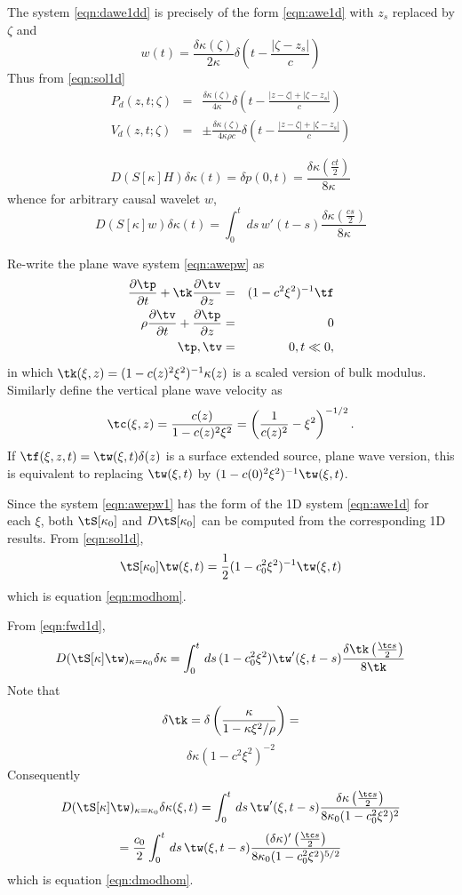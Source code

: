 The system \ref{eqn:dawe1dd} is precisely of the form
\ref{eqn:awe1d} with $z_s$ replaced by $\zeta$ and
\[
  w(t)= \frac{\delta\kappa(\zeta)}{2\kappa}\delta\left(t - \frac{|\zeta-z_s|}{c}\right)
\]
Thus from \ref{eqn:sol1d}
\begin{eqnarray*}
  P_d(z,t;\zeta) &=& \frac{\delta\kappa(\zeta)}{4\kappa} \delta\left(t - \frac{|z-\zeta|+|\zeta-z_s|}{c}\right) \nonumber \\
  V_d(z,t;\zeta) &=& \pm\frac{\delta\kappa(\zeta)}{4\kappa \rho c} \delta\left(t - \frac{|z-\zeta|+|\zeta-z_s|}{c}\right) 
\end{eqnarray*}

\begin{equation}
\label{eqn:imp1d}
D(S[\kappa]H)\delta \kappa (t) = \delta p(0,t)=  \frac{\delta 
  \kappa\left(\frac{ct}{2}\right)}{8\kappa} 
\end{equation}
whence for arbitrary causal wavelet $w$,
\begin{equation}
\label{eqn:fwd1d}
D(S[\kappa]w)\delta \kappa (t) = \int_0^t\,ds\,w'(t-s)\frac{\delta 
  \kappa\left(\frac{cs}{2}\right)}{8\kappa} 
\end{equation}

Re-write the plane wave system \ref{eqn:awepw} as
\begin{eqnarray}
\label{eqn:awepw1}
\frac{\partial \tp}{\partial t} + \tk\frac{\partial
  \tv}{\partial z} &=& (1-c^2\xi^2)^{-1}\tf \nonumber\\
\rho \frac{\partial \tv}{\partial t} + \frac{\partial \tp}{\partial
  z}&=&0\nonumber\\
\tp,\tv&=&0, t \ll 0,
\end{eqnarray}
in which $\tk(\xi,z)=(1-c(z)^2\xi^2)^{-1}\kappa(z)$ is a scaled version of
bulk modulus. Similarly define the vertical plane wave velocity as
\[
\tc(\xi,z)=\frac{c(z)}{1-c(z)^2\xi^2} =
\left(\frac{1}{c(z)^2}-\xi^2\right)^{-1/2}.
\]
If $\tf(\xi,z,t)=\tw(\xi,t)\delta(z)$ is a surface
extended source, plane wave version, this is equivalent to replacing
$\tw(\xi,t)$ by $(1-c(0)^2\xi^2)^{-1}\tw(\xi,t)$.

Since the system \ref{eqn:awepw1} has the form of the 1D system
\ref{eqn:awe1d} for each $\xi $, both $\tS[\kappa_0] $ and
$D\tS[\kappa_0]$ can be computed from the corresponding 1D
results. From \ref{eqn:sol1d},
\[
\tS[\kappa_0]\tw(\xi,t)=\frac{1}{2}(1-c_0^2\xi^2)^{-1}\tw(\xi,t)
\]
which is equation \ref{eqn:modhom}.

From \ref{eqn:fwd1d},
\[
D(\tS[\kappa]\tw)_{\kappa=\kappa_0}\delta \kappa = \int_0^t\,ds\,(1-c_0^2\xi^2)\tw'(\xi,t-s)\frac{\delta 
  \tk \left(\frac{\tc s}{2}\right)}{8\tk} 
\]
Note that 
\[
\delta \tk = \delta \left(\frac{\kappa}{1-\kappa \xi^2/\rho}\right) = 
\]
\[
\delta \kappa (1-c^2\xi^2)^{-2}
\]
Consequently 
\[
D(\tS[\kappa]\tw)_{\kappa=\kappa_0}\delta \kappa(\xi,t) =
\int_0^t\,ds\,\tw'(\xi,t-s)\frac{\delta \kappa  \left(\frac{\tc 
      s}{2}\right)}{8\kappa_0 (1-c_0^2\xi^2)^2} 
\]
\[
= \frac{c_0}{2}\int_0^t\,ds\,\tw(\xi,t-s)\frac{(\delta \kappa)'  \left(\frac{\tc 
      s}{2}\right)}{8\kappa_0 (1-c_0^2\xi^2)^{5/2}} 
\]
which is equation \ref{eqn:dmodhom}.


